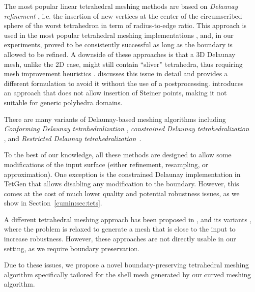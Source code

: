 The most popular linear tetrahedral meshing methods are based on {\em Delaunay refinement}
\cite{chew1993guaranteed,shewchuk1998tetrahedral,ruppert1995delaunay}, i.e. the insertion of new vertices at the center of the circumscribed sphere of the worst
tetrahedron in term of radius-to-edge ratio. This approach is used in the most popular tetrahedral meshing implementations  \cite{tetgen,jamin2015cgalmesh}, and, in
our experiments, proved to be consistently successful as long as the boundary is allowed to be refined. A downside of these approaches is that a 3D Delaunay mesh, unlike the 2D case, might still contain ``sliver'' tetrahedra, thus requiring mesh improvement
heuristics \cite{cheng2000silver,du2003tetrahedral,alliez2005variational,tournois2009interleaving}. \cite{Alexa:2019} discusses this issue in detail and provides a different formulation to avoid it without the use of a postprocessing. 
%
\cite{alexa2020conforming} introduces an approach that does not allow insertion of Steiner points, making it not suitable for generic polyhedra domains.

There are many variants of {Delaunay-based} meshing algorithms including 
{\em Conforming Delaunay tetrahedralization}
\cite{murphy2001point,CohenSteiner:2002:CDT}, {\em constrained Delaunay tetrahedralization}
\cite{chew1989constrained,si2005meshing,shewchuk2002constrained,Si:2014:ICA}, and {\em Restricted Delaunay tetrahedralization}\ \cite{cheng2008practical,boissonnat2005provably,Engwirda16}.

To the best of our knowledge, all these methods are designed to allow some modifications of the input surface (either refinement, resampling, or approximation). One exception is the constrained Delaunay implementation in TetGen \cite{tetgen} that allows disabling any modification to the boundary. However, this comes at the cost of much lower quality and potential robustness issues, as we show in Section~\ref{cumin:sec:tets}.

A different tetrahedral meshing approach has been proposed in \cite{hu2018tetrahedral}, and its variants \cite{Hu:2020:fTetWild,hu2019triwild}, where the problem is relaxed to generate a mesh that is close to the input to increase robustness. However, these approaches are not directly usable in our setting, as we require boundary preservation.

Due to these issues, we propose a novel boundary-preserving tetrahedral meshing algorithm specifically tailored for the shell mesh generated by our curved meshing algorithm.



